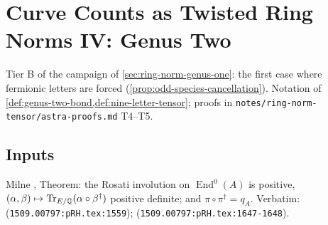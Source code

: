 
\section{Curve Counts as Twisted Ring Norms IV: Genus Two}
\label{sec:ring-norm-genus-two}

Tier B of the campaign of \cref{sec:ring-norm-genus-one}: the first case where fermionic
letters are forced (\cref{prop:odd-species-cancellation}). Notation of
\cref{def:genus-two-bond,def:nine-letter-tensor}; proofs in
\texttt{notes/ring-norm-tensor/astra-proofs.md} T4--T5.

\subsection{Inputs}

\begin{citedfact}[Rosati positivity and $\pi\pi^\dagger = \qs$]
\label{cit:rosati-positive}
Milne \cite{milne2015rh}, Theorem: the Rosati involution on $\operatorname{End}^0(A)$ is positive,
$(\alpha,\beta)\mapsto\operatorname{Tr}_{E/\mathbb Q}(\alpha\circ\beta^\dagger)$ positive definite; and %
$\pi\circ\pi^\dagger = q_A$.
Verbatim: \texttt{} (\texttt{1509.00797:pRH.tex:1559});
\texttt{} (\texttt{1509.00797:pRH.tex:1647-1648}).
\end{citedfact}

